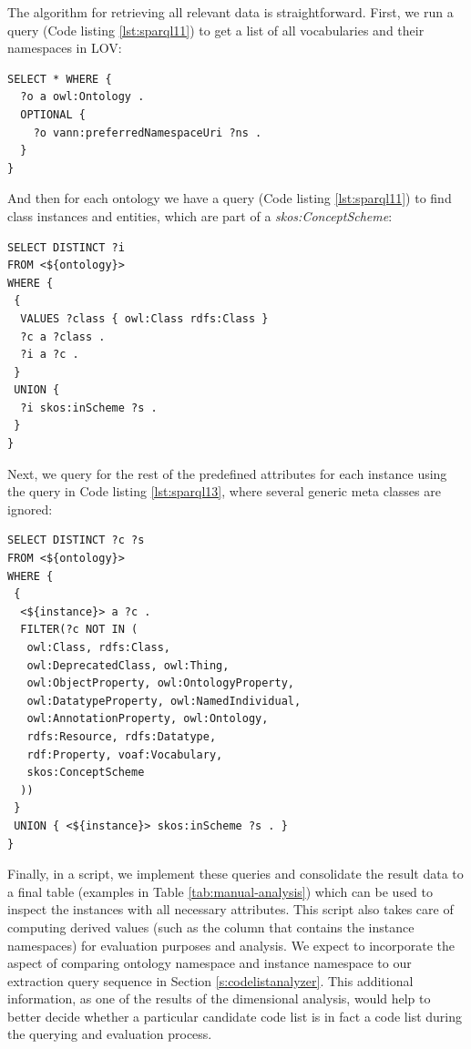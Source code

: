 The algorithm for retrieving all relevant data is straightforward. First, we run a query (Code listing \ref{lst:sparql11}) to get a list of all vocabularies and their namespaces in LOV:

\begin{lstlisting}[captionpos=b, caption=Query to retrieve all ontologies and their namespaces,label=lst:sparql11,basicstyle=\ttfamily,frame=single]
SELECT * WHERE {
  ?o a owl:Ontology .
  OPTIONAL { 
    ?o vann:preferredNamespaceUri ?ns . 
  }
}
\end{lstlisting}

And then for each ontology we have a query (Code listing \ref{lst:sparql11}) to find class instances and entities, which are part of a \textit{skos:ConceptScheme}:

\begin{lstlisting}[captionpos=b, caption=Query to retrieve all class instances and skos:ConceptScheme members,label=lst:sparql12,basicstyle=\ttfamily,frame=single]
SELECT DISTINCT ?i
FROM <${ontology}>
WHERE {
 {
  VALUES ?class { owl:Class rdfs:Class }
  ?c a ?class .
  ?i a ?c .
 }
 UNION {
  ?i skos:inScheme ?s .
 }
}
\end{lstlisting}

Next, we query for the rest of the predefined attributes for each instance using the query in Code listing \ref{lst:sparql13}, where several generic meta classes are ignored:

\begin{lstlisting}[captionpos=b, caption=Query to retrieve all class instances and skos:ConceptScheme members,label=lst:sparql13,basicstyle=\ttfamily,frame=single]
SELECT DISTINCT ?c ?s
FROM <${ontology}>
WHERE {
 {
  <${instance}> a ?c .
  FILTER(?c NOT IN (
   owl:Class, rdfs:Class,
   owl:DeprecatedClass, owl:Thing, 
   owl:ObjectProperty, owl:OntologyProperty,
   owl:DatatypeProperty, owl:NamedIndividual,
   owl:AnnotationProperty, owl:Ontology,
   rdfs:Resource, rdfs:Datatype,
   rdf:Property, voaf:Vocabulary, 
   skos:ConceptScheme
  ))
 }
 UNION { <${instance}> skos:inScheme ?s . }
}
\end{lstlisting}

Finally, in a script, %
we implement these queries and consolidate the result data to a final table %
(examples in Table \ref{tab:manual-analysis}) which can be used to inspect the instances with all necessary attributes. This script also takes care of computing derived values (such as the column that contains the instance namespaces) for evaluation purposes and analysis. We expect to incorporate the aspect of comparing ontology namespace and instance namespace to our extraction query sequence in Section \ref{s:codelistanalyzer}. This additional information, as one of the results of the dimensional analysis, would help to better decide whether a particular candidate code list is in fact a code list during the querying and evaluation process.


